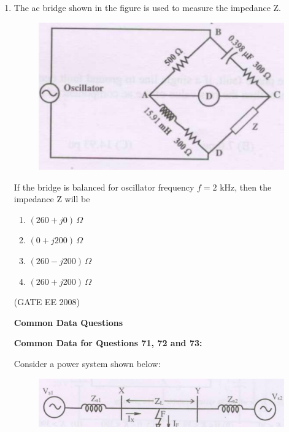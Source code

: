 \documentclass[journal,12pt,onecolumn]{IEEEtran}
\theoremstyle{remark}
\begin{document}
\begin{enumerate}[start=1, label=Q.\arabic*]
\item The ac bridge shown in the figure is used to measure the impedance Z.

\begin{figure}[H]
    \centering
    \includegraphics[width=\columnwidth]{Fig/q70.png}
    \caption{}
\end{figure}

If the bridge is balanced for oscillator frequency $f=2$ kHz, then the impedance Z will be

\begin{multicols}{4}
\begin{enumerate}
    \item $(260 + j0)\,\Omega$
    \item $(0 + j200)\,\Omega$
    \item $(260 - j200)\,\Omega$
    \item $(260 + j200)\,\Omega$
\end{enumerate}
\end{multicols}
\hfill (GATE EE 2008)


\begin{center}
\textbf{Common Data Questions}
\end{center}

\textbf{Common Data for Questions 71, 72 and 73:}

Consider a power system shown below:

\begin{figure}[H]
    \centering
    \includegraphics[width=\columnwidth]{Fig/comp1.png}
    \caption{}
\end{figure}


\end{enumerate}
\end{document}
